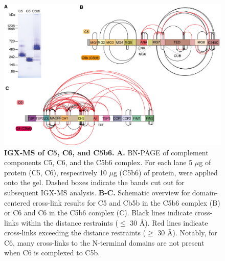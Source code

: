 \begin{subappendices}
    \begin{figure}[hbt!]
        \center
        \includegraphics[width=\textwidth]{Chapter.2/Figures/SI_Fig5.png} 
        \caption{\textbf{IGX-MS of C5, C6, and C5b6.} \textbf{A.} BN-PAGE of complement components C5, C6, and the C5b6 complex. For each lane 5 $\mu$g of protein (C5, C6), respectively 10 $\mu$g (C5b6) of protein, were applied onto the gel. Dashed boxes indicate the bands cut out for subsequent IGX-MS analysis. \textbf{B-C.} Schematic overview for domain-centered cross-link results for C5 and Cb5b in the C5b6 complex (B) or C6 and C6 in the C5b6 complex (C). Black lines indicate cross-links within the distance restraints ($\leq$ 30 Å). Red lines indicate cross-links exceeding the distance restraints ($\geq$ 30 Å). Notably, for C6, many cross-links to the N-terminal domains are not present when C6 is complexed to C5b.}
        \label{fig:ch2_app_fig6}
    \end{figure}


\end{subappendices}
